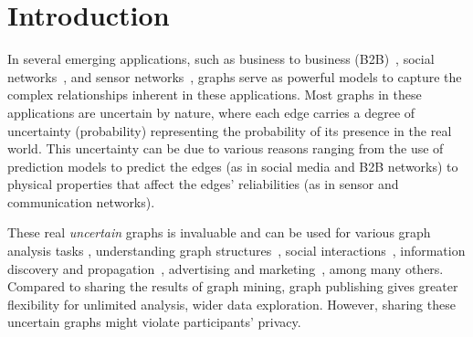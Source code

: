 \section{Introduction}
\label{sec:Intro}

In several emerging applications, such as business to business (B2B)~\cite{Lin_B2B}, social networks~\cite{Adar_Managing_2007, Kempe_Maximizing_2003}, and sensor networks~\cite{ZhangSensorNetwork}, graphs serve as powerful models to capture the complex relationships inherent in these applications. 
Most graphs in these applications are uncertain by nature, where each edge carries a degree of uncertainty (probability) representing the probability of its presence in the real world. This uncertainty can be due to various reasons ranging from the use of prediction models to predict the edges (as in social media and B2B networks) to physical properties that affect the edges' reliabilities (as in sensor and communication networks).  

These real \emph{uncertain} graphs is invaluable and can be used for various graph analysis tasks {\eg}, understanding  graph structures~\cite{Bollacker_Freebase_2008,Krogan_Global_2006}, social interactions~\cite{Cho_Friendship_2011}, 
information discovery and propagation~\cite{Zhao_Detecting_2014}, advertising and marketing~\cite{Kempe_Maximizing_2003}, among many others.
Compared to sharing the results of graph mining, graph publishing gives greater flexibility for unlimited analysis,  wider data exploration. However, sharing these uncertain graphs might violate participants' privacy.   

